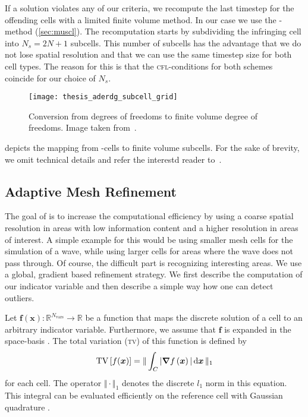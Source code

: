 If a solution violates any of our criteria, we recompute the last timestep for the offending cells with a limited finite volume method.
In our case we use the \muscl{}-method (\cref{sec:muscl}).
The recomputation starts by subdividing the infringing cell into $N_s = 2N + 1$ subcells.
This number of subcells has the advantage that we do not lose spatial resolution and that we can use the same timestep size for both cell types.
The reason for this is that the \textsc{cfl}-conditions for both schemes  coincide for our choice of $N_s$.
\begin{figure}[htb]
  \centering
  \texttt{[image: thesis\_aderdg\_subcell\_grid]}
  \caption{\label{fig:limiting-subcells}Conversion from \dg{} degrees of freedoms to finite volume degree of freedoms. Image taken from~\cite{dumbser2018conformal}. }
\end{figure}

 depicts the mapping from \dg{}-cells to finite volume subcells.
For the sake of brevity, we omit technical details and refer the interestd reader to~\cite{dumbser2016simple}.

\subsection{Adaptive Mesh Refinement}\label{sec:amr}
The goal of \amr{} is to increase the computational efficiency by using a coarse spatial resolution in areas with low information content and a higher resolution in areas of interest.
A simple example for this would be using smaller mesh cells for the simulation of a wave, while using larger cells for areas where the wave does not pass through.
Of course, the difficult part is recognizing interesting areas.
We use a global, gradient based refinement strategy.
We first describe the computation of our indicator variable and then describe a simple way how one can detect outliers.

Let $\bm{f}(\bm{x}): \mathbb{R}^{N_\text{vars}} \to \mathbb{R}$ be a function that maps the discrete solution of a cell to an arbitrary indicator variable.
Furthermore, we assume that $\bm{f}$ is expanded in the space-basis .
The total variation (\textsc{tv}) of this function is defined by
\begin{equation}
  \label{eq:tv}
  \tv \left[ f(\bm{x}) \right] =
  \Vert
\intdcell{ \vert \gradient{f \left( \bm{x} \right)} \vert }
\Vert_1
\end{equation}
for each cell.
The operator $\Vert \cdot \Vert_1$ denotes the discrete $l_1$ norm in this equation.
This integral can be evaluated efficiently on the reference cell  with Gaussian quadrature .

